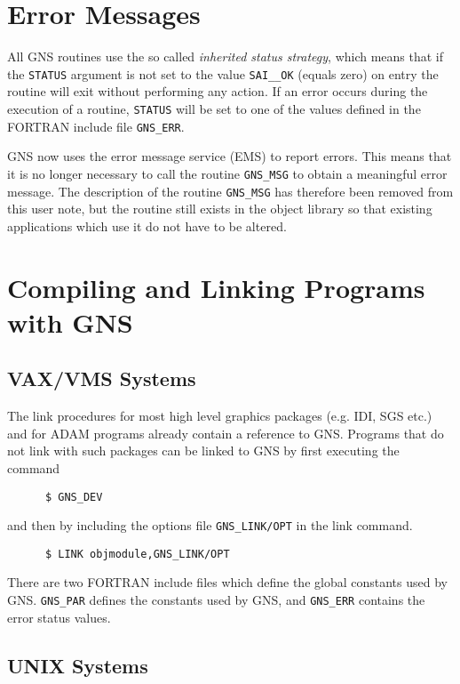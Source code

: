 \section{Error Messages}\label{er}

All GNS routines use the so called {\em inherited status strategy}, which means
that if the {\tt STATUS} argument is not set to the value {\tt SAI\_\_OK}
(equals zero) on entry the routine will exit without performing any action. If
an error occurs during the execution of a routine, {\tt STATUS} will be set to
one of the values defined in the FORTRAN include file {\tt GNS\_ERR}.

GNS now uses the error message service (EMS) to report errors. This means
that it is no longer necessary to call the routine {\tt GNS\_MSG} to obtain
a meaningful error message. The description of the routine {\tt GNS\_MSG}
has therefore been removed from this user note, but the routine still exists
in the object library so that existing applications which use it do not have
to be altered.

\section{Compiling and Linking Programs with GNS}\label{cl}

\subsection{VAX/VMS Systems}

The link procedures for most high level graphics packages (e.g. IDI, SGS etc.)
and for ADAM programs already contain a reference to GNS. Programs that do not
link with such packages can be linked to GNS by first executing the command
\begin{verbatim}
      $ GNS_DEV
\end{verbatim}
and then by including the options file {\tt GNS\_LINK/OPT} in the
link command.
\begin{verbatim}
      $ LINK objmodule,GNS_LINK/OPT
\end{verbatim}

There are two FORTRAN include files which define the global constants used
by GNS. {\tt GNS\_PAR} defines the constants used by GNS, and {\tt GNS\_ERR}
contains the error status values.

\subsection{UNIX Systems}

